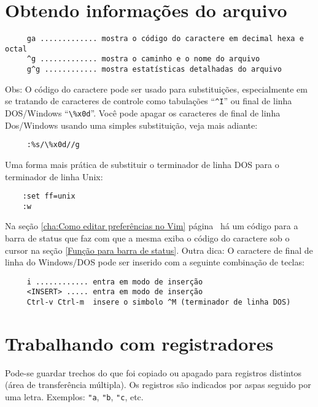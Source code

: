 \section{Obtendo informações do arquivo}

\begin{verbatim}
     ga ............. mostra o código do caractere em decimal hexa e octal
     ^g ............. mostra o caminho e o nome do arquivo
     g^g ............ mostra estatísticas detalhadas do arquivo
\end{verbatim}

Obs: O código do caractere pode ser usado para substituições,
especialmente em se tratando de caracteres de controle como tabulações
``\verb|^I|'' ou final de linha DOS/Windows ``\verb|\%x0d|''. Você pode apagar os
caracteres de final de linha Dos/Windows usando uma simples
substituição, veja mais adiante:

\begin{verbatim}
     :%s/\%x0d//g
\end{verbatim}

Uma forma mais prática de substituir o terminador de linha DOS para o
terminador de linha Unix:

\begin{verbatim}
    :set ff=unix
    :w
\end{verbatim}

Na seção \ref{cha:Como editar preferências no Vim}
página~\pageref{cha:Como editar preferências no Vim}
há um código para a barra de
status que faz com que a mesma exiba o código do caractere sob o cursor na
seção \ref{Função para barra de status}. Outra dica: O caractere de final de linha
do Windows/DOS pode ser inserido com a seguinte combinação de teclas:

\begin{verbatim}
     i ............ entra em modo de inserção
     <INSERT> ..... entra em modo de inserção
     Ctrl-v Ctrl-m  insere o simbolo ^M (terminador de linha DOS)
\end{verbatim}

\section{Trabalhando com registradores}
\label{Trabalhando com registradores}

Pode-se guardar trechos do que foi copiado ou apagado para
registros distintos (área de transferência múltipla).
Os registros são indicados por aspas seguido por uma letra.
Exemplos: {\tt "a}, {\tt "b}, {\tt "c}, etc.


